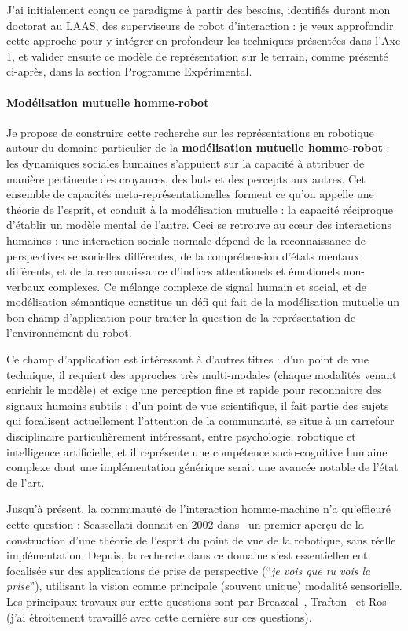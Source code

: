\documentclass[a4paper]{article}
\begin{document}
J'ai initialement conçu ce paradigme à partir des besoins, identifiés durant
mon doctorat au LAAS, des superviseurs de robot d'interaction : je veux
approfondir cette approche pour y intégrer en profondeur les techniques
présentées dans l'Axe 1, et valider ensuite ce modèle de représentation sur le
terrain, comme présenté ci-après, dans la section Programme Expérimental.

\paragraph{Modélisation mutuelle homme-robot}


Je propose de construire cette recherche sur les représentations en robotique
autour du domaine particulier de la \textbf{modélisation mutuelle homme-robot} :
les dynamiques sociales humaines s'appuient sur la capacité à attribuer de
manière pertinente des croyances, des buts et des percepts aux autres. Cet
ensemble de capacités meta-représentationelles forment ce qu'on appelle une
théorie de l'esprit, et conduit à la modélisation mutuelle : la capacité
réciproque d'établir un modèle mental de l'autre. Ceci se retrouve au c\oe ur
des interactions humaines : une interaction sociale normale dépend de la
reconnaissance de perspectives sensorielles différentes, de la compréhension
d'états mentaux différents, et de la reconnaissance d'indices attentionels et
émotionels non-verbaux complexes.  Ce mélange complexe de signal humain et
social, et de modélisation sémantique constitue un défi qui fait de la
modélisation mutuelle un bon champ d'application pour traiter la question de la
représentation de l'environnement du robot.

Ce champ d'application est intéressant à d'autres titres : d'un point de vue
technique, il requiert des approches très multi-modales (chaque modalités venant
enrichir le modèle) et exige une perception fine et rapide pour reconnaitre des
signaux humains subtils ; d'un point de vue scientifique, il fait partie des
sujets qui focalisent actuellement l'attention de la communauté, se situe à un
carrefour disciplinaire particulièrement intéressant, entre psychologie,
robotique et intelligence artificielle, et il représente une compétence
socio-cognitive humaine complexe dont une implémentation générique serait une
avancée notable de l'état de l'art.

Jusqu'à présent, la communauté de l'interaction homme-machine n'a qu'effleuré
cette question : Scassellati donnait en 2002 dans~\cite{scassellati2002theory}
un premier aperçu de la construction d'une théorie de l'esprit du point de vue
de la robotique, sans réelle implémentation. Depuis, la recherche dans ce
domaine s'est essentiellement focalisée sur des applications de prise de
perspective (``\emph{je vois que tu vois la prise}''), utilisant la
vision comme principale (souvent unique) modalité sensorielle. Les principaux
travaux sur cette questions sont par Breazeal~\cite{breazeal2006using},
Trafton~\cite{Trafton2005} et Ros~\cite{Ros2010} (j'ai étroitement travaillé
avec cette dernière sur ces questions).
\end{document}
